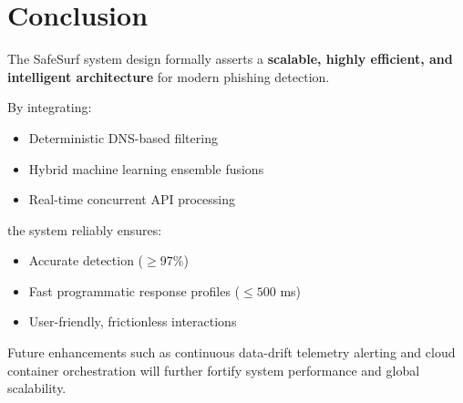 \section{Conclusion}
\noindent
The SafeSurf system design formally asserts a \textbf{scalable, highly efficient, and intelligent architecture} for modern phishing detection.

By integrating:

\begin{itemize}
    \item Deterministic DNS-based filtering
    \item Hybrid machine learning ensemble fusions
    \item Real-time concurrent API processing
\end{itemize}

the system reliably ensures:

\begin{itemize}
    \item Accurate detection ($\geq 97\%$)
    \item Fast programmatic response profiles ($\leq 500$ ms)
    \item User-friendly, frictionless interactions
\end{itemize}
\noindent
Future enhancements such as continuous data-drift telemetry alerting and cloud container orchestration will further fortify system performance and global scalability.

